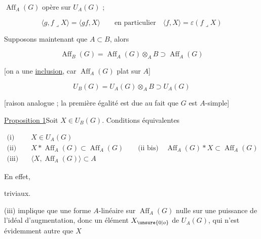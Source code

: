 $\operatorname{Aff}_A(G)$ opère  sur $U_A(G)$ ;   

\[
\langle g,f\mathbin{\lrcorner}X\rangle=\langle gf,X\rangle
\qquad\text{en particulier}\quad\langle f,X\rangle=\varepsilon(f\mathbin{\lrcorner}X)
\]

Supposons maintenant que $A\subset B$, alors

\[
\operatorname{Aff}_B(G)=\operatorname{Aff}_A(G)\otimes_A B\supset\operatorname{Aff}_A(G)
\]

[on a une \uline{inclusion}, car $\operatorname{Aff}_A(G)$ plat sur $A$]

\[
U_B(G)=U_A(G)\otimes_A B\supset U_A(G)
\]

[raison analogue ; la première égalité est due au fait que $G$ est $A$-simple]

\uline{Proposition 1}\quad Soit $X\in U_B(G)$. Conditions équivalentes

\[
\begin{aligned}
\text{(i)}\quad &X\in U_A(G)\\
\text{(ii)}\quad &X*\operatorname{Aff}_A(G)\subset\operatorname{Aff}_A(G)
  \qquad\text{(ii bis)}\quad\operatorname{Aff}_A(G)*X\subset\operatorname{Aff}_A(G)\\
\text{(iii)}\quad &\langle X,\operatorname{Aff}_A(G)\rangle\subset A
\end{aligned}
\]

En effet,


triviaux.

(iii) implique que    une forme $A$-linéaire sur $\operatorname{Aff}_A(G)$ nulle sur une puissance de l'idéal d'augmentation, donc un élément $X_{\unsure{0|o}}$ de $U_A(G)$, qui n'est évidemment autre que $X$
